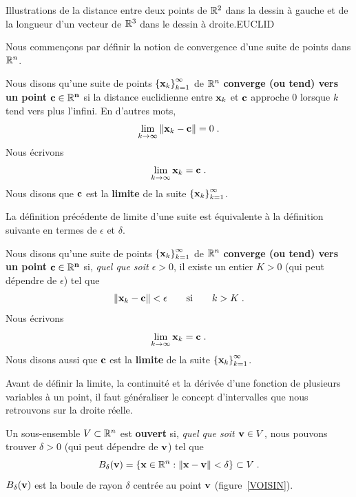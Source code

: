 {
{Illustrations de la distance entre deux points de $\mathbb{R}^2$ dans la
dessin à gauche et de la longueur d'un vecteur de $\mathbb{R}^3$ dans le
dessin à droite.}{EUCLID}

Nous commençons par définir la notion de convergence d'une suite de points
dans $\mathbb{R}^n$.

\begin{focus}{\dfn}
Nous disons qu'une suite de points
$\displaystyle \left\{\mathbf{x}_k\right\}_{k=1}^\infty$ de $\mathbb{R}^n$
{\bfseries converge (ou tend) vers un point
$\mathbf{\mathbf{c} \in \mathbb{R}^n}$} si la
distance euclidienne entre $\mathbf{x}_k$ et $\mathbf{c}$ approche $0$
lorsque $k$ tend vers plus l'infini.  En d'autres mots,
\[
\lim_{k\rightarrow \infty} \|\mathbf{x}_k-\mathbf{c}\| = 0 \; .
\]
Nous écrivons
\[
\lim_{k\rightarrow \infty} \mathbf{x}_k = \mathbf{c} \; .
\]
Nous disons que $\mathbf{c}$ est la {\bfseries limite} de
la suite $\displaystyle \left\{\mathbf{x}_k\right\}_{k=1}^\infty$.
\end{focus}

La définition précédente de limite d'une suite est équivalente à la
définition suivante en termes de $\epsilon$ et $\delta$.

\begin{focus}[\theory]{\dfn}
Nous disons qu'une suite de points 
$\displaystyle \left\{\mathbf{x}_k\right\}_{k=1}^\infty$ de $\mathbb{R}^n$
{\bfseries converge (ou tend) vers un point
$\mathbf{\mathbf{c} \in \mathbb{R}^n}$} si,
{\em quel que soit $\epsilon >0$}, il existe un entier $K>0$ (qui peut
dépendre de $\epsilon$) tel que
\[
\| \mathbf{x}_k - \mathbf{c} \| < \epsilon \qquad \text{si} \qquad k>K \; .
\]
Nous écrivons
\[
\lim_{k\rightarrow \infty} \mathbf{x}_k = \mathbf{c} \; .
\]
Nous disons aussi que $\mathbf{c}$ est la {\bfseries limite}
de la suite $\displaystyle \left\{\mathbf{x}_k\right\}_{k=1}^\infty$.
\end{focus}

Avant de définir la limite, la continuité et la dérivée d'une fonction
de plusieurs variables à un point, il faut généraliser le concept
d'intervalles que nous retrouvons sur la droite réelle.

\begin{focus}{\dfn}
Un sous-ensemble $V \subset \mathbb{R}^n$ est
{\bfseries ouvert} si,
{\em quel que soit $\mathbf{v} \in V$}, nous pouvons trouver $\delta>0$ (qui
peut dépendre de $\mathbf{v}$) tel que
\[
B_\delta(\mathbf{v}) = \{ \mathbf{x} \in \mathbb{R}^n : \|\mathbf{x} - \mathbf{v}\| <
\delta \} \subset V \; .
\]
$\displaystyle B_\delta(\mathbf{v})$ est la boule de rayon $\delta$
centrée au point $\mathbf{v}$ (figure~\ref{VOISIN}).


\end{focus}}
